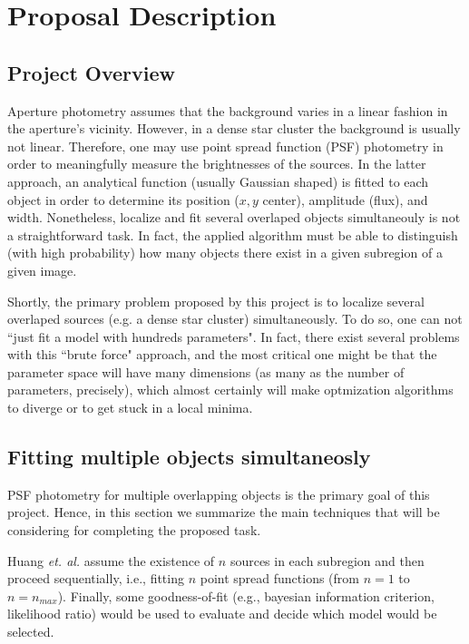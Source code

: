 \documentclass[11pt]{article}
\begin{document}

\section{Proposal Description}
\subsection{Project Overview}
Aperture photometry assumes that the background varies in a linear fashion in the aperture's vicinity. However, in a dense star cluster the background is usually not linear. Therefore, one may use point spread function (PSF) photometry in order to meaningfully measure the brightnesses of the sources. In the latter approach, an analytical function (usually Gaussian shaped) is fitted to each object in order to determine its position ($x,y$ center), amplitude (flux), and width. Nonetheless, localize and fit several overlaped objects simultaneouly is not a straightforward task. In fact, the applied algorithm must be able to distinguish (with high probability) how many objects there exist in a given subregion of a given image.

Shortly, the primary problem proposed by this project is to localize several overlaped sources (e.g. a dense star cluster) simultaneously. To do so, one can not ``just fit a model with hundreds parameters". In fact, there exist several problems with this ``brute force" approach, and the most critical one might be that the parameter space will have many dimensions (as many as the number of parameters, precisely), which almost certainly will make optmization algorithms to diverge or to get stuck in a local minima.

\subsection{Fitting multiple objects simultaneosly}

PSF photometry for multiple overlapping objects is the primary goal of this project. Hence, in this section we summarize the main techniques that will be considering for completing the proposed task.

Huang \textit{et. al.} assume the existence of $n$ sources in each subregion and then proceed sequentially, i.e., fitting $n$ point spread functions (from $n=1$ to $n = n_{max}$). Finally, some goodness-of-fit (e.g., bayesian information criterion, likelihood ratio) would be used to evaluate and decide which model would be selected.
\end{document}
